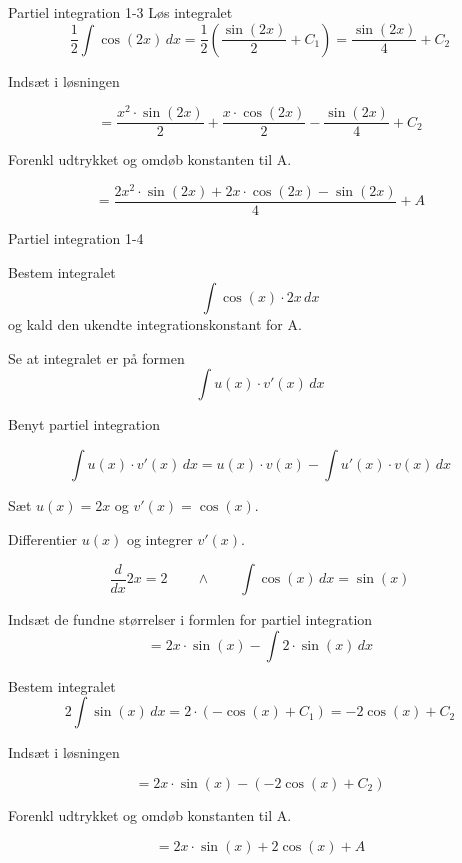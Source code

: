 \documentclass{article}
\begin{document}
\begin{exercise}{Partiel integration 1-3}
	\hint
	Løs integralet
	\[
	\frac{1}{2} \int \cos(2x) \, dx = \frac{1}{2} \left(\frac{\sin(2x)}{2} + C_1\right) = \frac{\sin(2x)}{4} + C_2
	\]
	
	\hint
	Indsæt i løsningen 
	
	\hint
	
	\[
	= \frac{x^2 \cdot \sin(2x)}{2} +  \frac{x \cdot \cos(2x)}{2} - \frac{\sin(2x)}{4} + C_2
	\]
	
	\hint
	
	Forenkl udtrykket og omdøb konstanten til A.
	
	\hint
	
	\[
	=  \frac{2x^2 \cdot \sin(2x)+2x\cdot \cos(2x) -  \sin(2x)}{4} +  A
	\]
	
	
\end{exercise}

\newpage

\begin{exercise}{Partiel integration 1-4}
	
	
	Bestem integralet
	\[
	\int \cos(x) \cdot 2x \, dx
	\]
	og kald den ukendte integrationskonstant for A.
	
	
	
	\hint
	
	Se at integralet er på formen
	\[
	\int u(x) \cdot v'(x) \, dx
	\]
	
	\hint
	
	Benyt partiel integration
	
	\hint
	\[
	\int u(x) \cdot v'(x)\, dx = u(x) \cdot v(x) - \int u'(x) \cdot v(x) \, dx
	\]
	\hint
	
	Sæt $u(x) = 2x$ og $v'(x) = \cos(x)$.
	
	
	\hint
	
	Differentier $u(x)$ og integrer $v'(x)$.
	
	\hint
	\[
	\frac{d}{dx}2x = 2 \qquad \wedge \qquad \int \cos(x) \, dx = \sin(x)
	\]
	
	\hint
	
	Indsæt de fundne størrelser i formlen for partiel integration
	\[
	= 2x \cdot \sin(x) - \int 2 \cdot \sin(x) \, dx
	\]
	
	\hint
	
	Bestem integralet
	\[
	2 \int \sin(x) \, dx = 2 \cdot (-\cos(x) + C_1) = -2 \cos(x) + C_2
	\]
	
	\hint
	Indsæt i løsningen 
	
	\hint
	
	\[
	= 2x \cdot \sin(x) -(-2 \cos(x) + C_2)
	\]
	
	\hint
	
	Forenkl udtrykket og omdøb konstanten til A.
	
	\hint
	
	\[
	= 2x \cdot \sin(x) + 2 \cos(x) + A
	\]
	
	
\end{exercise}
\end{document}
